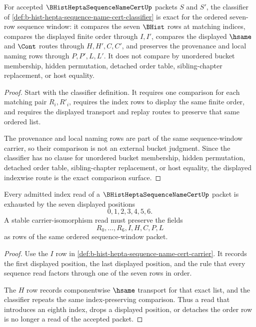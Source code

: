 \begin{theorem}
\label{thm:b-hist-hepta-sequence-name-cert-classifier-exactness}
For accepted $\BHistHeptaSequenceNameCertUp$ packets $S$ and $S'$, the classifier of \autoref{def:b-hist-hepta-sequence-name-cert-classifier} is exact for the ordered seven-row sequence window: it compares the seven $\BHist$ rows at matching indices, compares the displayed finite order through $I,I'$, compares the displayed $\hsame$ and $\Cont$ routes through $H,H',C,C'$, and preserves the provenance and local naming rows through $P,P',L,L'$. It does not compare by unordered bucket membership, hidden permutation, detached order table, sibling-chapter replacement, or host equality.
\end{theorem}
\begin{proof}
Start with the classifier definition. It requires one comparison for each matching pair $R_i,R'_i$, requires the index rows to display the same finite order, and requires the displayed transport and replay routes to preserve that same ordered list.

The provenance and local naming rows are part of the same sequence-window carrier, so their comparison is not an external bucket judgment. Since the classifier has no clause for unordered bucket membership, hidden permutation, detached order table, sibling-chapter replacement, or host equality, the displayed indexwise route is the exact comparison surface.
\end{proof}

\begin{theorem}
\label{thm:b-hist-hepta-sequence-name-cert-index-exhaustion}
Every admitted index read of a $\BHistHeptaSequenceNameCertUp$ packet is exhausted by the seven displayed positions
$$
0,1,2,3,4,5,6.
$$
A stable carrier-isomorphism read must preserve the fields
$$
R_0,\ldots,R_6,I,H,C,P,L
$$
as rows of the same ordered sequence-window packet.
\end{theorem}
\begin{proof}
Use the $I$ row in \autoref{def:b-hist-hepta-sequence-name-cert-carrier}. It records the first displayed position, the last displayed position, and the rule that every sequence read factors through one of the seven rows in order.

The $H$ row records componentwise $\hsame$ transport for that exact list, and the classifier repeats the same index-preserving comparison. Thus a read that introduces an eighth index, drops a displayed position, or detaches the order row is no longer a read of the accepted packet.
\end{proof}

